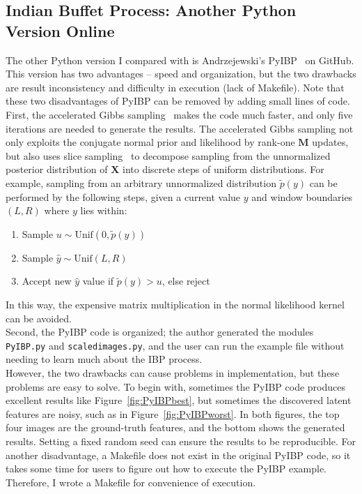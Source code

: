 \subsection{Indian Buffet Process: Another Python Version Online}

The other Python version I compared with is Andrzejewski's PyIBP~\cite{ibpgithub} on GitHub. This version has two advantages -- speed and organization, but the two drawbacks are result inconsistency and difficulty in execution (lack of Makefile). Note that these two disadvantages of PyIBP can be removed by adding small lines of code.\\

First, the accelerated Gibbs sampling~\cite{andrzejewski2011accelerated,doshi2009accelerated} makes the code much faster, and only five iterations are needed to generate the results. The accelerated Gibbs sampling not only exploits the conjugate normal prior and likelihood by rank-one $\mathbf{M}$ updates, but also uses slice sampling~\cite{andrzejewski2011accelerated} to decompose sampling from the unnormalized posterior distribution of $\mathbf{X}$ into discrete steps of uniform distributions. For example, sampling from an arbitrary unnormalized distribution $\widetilde{p}(y)$ can be performed by the following steps, given a current value $y$ and window boundaries $(L,R)$ where $y$ lies within:

\begin{enumerate}
\item Sample $u \sim \text{Unif}(0,\widetilde{p}(y))$
\item Sample $\widehat{y} \sim \text{Unif}(L,R)$
\item Accept new $\widehat{y}$ value if $\widetilde{p}(y) > u$, else reject
\end{enumerate}

In this way, the expensive matrix multiplication in the normal likelihood kernel can be avoided. \\

Second, the PyIBP code is organized; the author generated the modules \texttt{PyIBP.py} and \texttt{scaledimages.py}, and the user can run the example file without needing to learn much about the IBP process.\\

However, the two drawbacks can cause problems in implementation, but these problems are easy to solve. To begin with, sometimes the PyIBP code produces excellent results like Figure~\ref{fig:PyIBPbest}, but sometimes the discovered latent features are noisy, such as in Figure~\ref{fig:PyIBPworst}. In both figures, the top four images are the ground-truth features, and the bottom shows the generated results. Setting a fixed random seed can ensure the results to be reproducible. For another disadvantage, a Makefile does not exist in the original PyIBP code, so it takes some time for users to figure out how to execute the PyIBP example. Therefore, I wrote a Makefile for convenience of execution.


